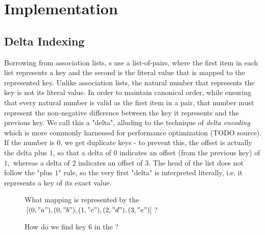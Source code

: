 \section{Implementation}
\label{sec:DD}

\subsection{Delta Indexing}

Borrowing from association lists, {\dd}s use a list-of-pairs, where the first item in each list represents
a key and the second is the literal value that is mapped to the represented key. Unlike association lists,
the natural number that represents the key is not its literal value. In order to maintain canonical order,
while ensuring that every natural number is valid as the first item in a pair, that number must represent
the non-negative difference between the key it represents and the previous key. We call this a "delta",
alluding to the technique of \emph{delta encoding} which is more commonly harnessed for performance
optimization (TODO source). If the number is $0$, we get duplicate keys - to prevent this, the offset is
actually the delta plus $1$, so that a delta of $0$ indicates an offset (from the previous key) of $1$,\
whereas a delta of $2$ indicates an offset of $3$. The head of the list does not follow the "plus $1$"
rule, so the very first "delta" is interpreted literally, i.e. it represents a key of its exact
value.

\begin{figure}[H]
  \centering
  \caption{What mapping is represented by the \dd~ $[(0, "a"), (0, "b"), (1, "c"), (2, "d"), (3, "e")]$?}
  \label{fig:mech1}
\end{figure}

\begin{figure}[H]
  \centering
  \caption{How do we find key $6$ in the \dd?}
  \label{fig:find-6}
\end{figure}


